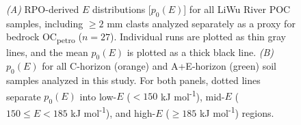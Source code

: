 \begin{figure}[p]
	\label{Ch6Fig:S2} 
\end{figure}

\begin{figure}[p]
	\caption[RPO $p_{0}(E)$ distributions for all samples analyzed]{\textit{(A)} RPO-derived $E$ distributions [$p_{0}(E)$] for all LiWu River POC samples, including $\geq 2$ mm clasts analyzed separately as a proxy for bedrock OC\textsubscript{petro} ($n = 27$). Individual runs are plotted as thin gray lines, and the mean $p_{0}(E)$ is plotted as a thick black line. \textit{(B)} $p_{0}(E)$ for all C-horizon (orange) and A+E-horizon (green) soil samples analyzed in this study. For both panels, dotted lines separate $p_{0}(E)$ into low-$E$ ($< 150$ kJ mol\textsuperscript{-1}), mid-$E$ ($150 \leq E < 185$ kJ mol\textsuperscript{-1}), and high-$E$ ($\geq 185$ kJ mol\textsuperscript{-1}) regions.}
	\label{Ch6Fig:S3} 
\end{figure}

\renewcommand\thefigure{\thechapter.\arabic{figure}}
